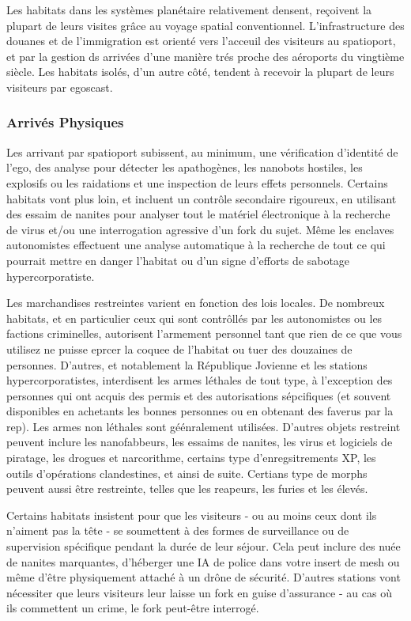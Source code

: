 Les habitats dans les systèmes planétaire relativement densent, reçoivent la plupart de leurs visites grâce au voyage spatial conventionnel. L'infrastructure des douanes et de l'immigration est orienté vers l'acceuil des visiteurs au spatioport, et par la gestion ds arrivées d'une manière trés proche des aéroports du vingtième siècle. Les habitats isolés, d'un autre côté, tendent à recevoir la plupart de leurs visiteurs par egoscast. 

\subsubsection{Arrivés Physiques} 

Les arrivant par spatioport subissent, au minimum, une vérification d'identité de l'ego, des analyse pour détecter les apathogènes, les nanobots hostiles, les explosifs ou les raidations et une inspection de leurs effets personnels. Certains habitats vont plus loin, et incluent un contrôle secondaire rigoureux, en utilisant des essaim de nanites pour analyser tout le matériel électronique à la recherche de virus et/ou une interrogation agressive d'un fork du sujet. Même les enclaves autonomistes effectuent une analyse automatique à la recherche de tout ce qui pourrait mettre en danger l'habitat ou d'un signe d'efforts de sabotage hypercorporatiste. 

Les marchandises restreintes varient en fonction des lois locales. De nombreux habitats, et en particulier ceux qui sont contrôllés par les autonomistes ou les factions criminelles, autorisent l'armement personnel tant que rien de ce que vous utilisez ne puisse eprcer la coquee de l'habitat ou tuer des douzaines de personnes. D'autres, et notablement la République Jovienne et les stations hypercorporatistes, interdisent les armes léthales de tout type, à l'exception des personnes qui ont acquis des permis et des autorisations sépcifiques (et souvent disponibles en achetants les bonnes personnes ou en obtenant des faverus par la rep). Les armes non léthales sont géénralement utilisées. D'autres objets restreint peuvent inclure les nanofabbeurs, les essaims de nanites, les virus et logiciels de piratage, les drogues et narcorithme, certains type d'enregsitrements XP, les outils d'opérations clandestines, et ainsi de suite. Certians type de morphs peuvent aussi être restreinte, telles que les reapeurs, les furies et les élevés. 

Certains habitats insistent pour que les visiteurs - ou au moins ceux dont ils n'aiment pas la tête - se soumettent à des formes de surveillance ou de supervision spécifique pendant la durée de leur séjour. Cela peut inclure des nuée de nanites marquantes, d'héberger une IA de police dans votre insert de mesh ou même d'être physiquement attaché à un drône de sécurité. D'autres stations vont nécessiter que leurs visiteurs leur laisse un fork en guise d'assurance - au cas où ils commettent un crime, le fork peut-être interrogé. 

